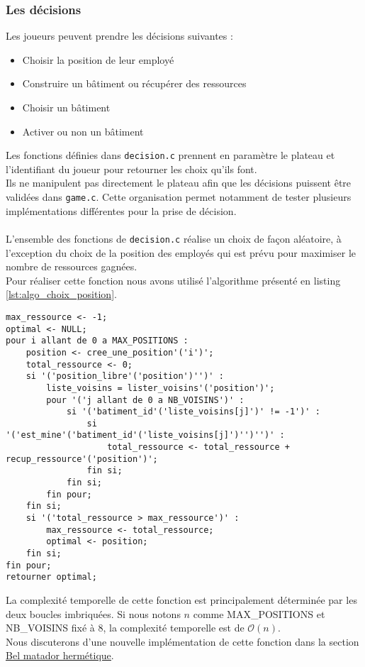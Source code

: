 \subsubsection{Les décisions}
\label{sec:dec}
Les joueurs peuvent prendre les décisions suivantes :
\begin{itemize}
 \setlength\itemsep{0.1em}
\item Choisir la position de leur employé
\item Construire un bâtiment ou récupérer des ressources
\item Choisir un bâtiment
\item Activer ou non un bâtiment
\end{itemize}
Les fonctions définies dans \texttt{decision.c} prennent en paramètre le plateau et l'identifiant du joueur pour retourner les choix qu'ils font.\\
Ils ne manipulent pas directement le plateau afin que les décisions puissent être validées dans \texttt{game.c}. Cette organisation permet notamment de tester plusieurs implémentations différentes pour la prise de décision.\\ \\
L'ensemble des fonctions de \texttt{decision.c} réalise un choix de façon aléatoire, à l'exception du choix de la position des employés qui est prévu pour maximiser le nombre de ressources gagnées.\\
Pour réaliser cette fonction nous avons utilisé l'algorithme présenté en listing \ref{lst:algo_choix_position}. \\
\begin{lstlisting}[style=customstyle]
max_ressource <- -1;
optimal <- NULL;
pour i allant de 0 a MAX_POSITIONS :
    position <- cree_une_position'('i')';
    total_ressource <- 0;
    si '('position_libre'('position')'')' :
        liste_voisins = lister_voisins'('position')';
        pour '('j allant de 0 a NB_VOISINS')' :
            si '('batiment_id'('liste_voisins[j]')' != -1')' :
                si '('est_mine'('batiment_id'('liste_voisins[j]')'')'')' :
                    total_ressource <- total_ressource + recup_ressource'('position')';
                fin si;
            fin si;
        fin pour;
    fin si;
    si '('total_ressource > max_ressource')' :
        max_ressource <- total_ressource;
        optimal <- position;
    fin si;
fin pour;
retourner optimal;
\end{lstlisting}
\label{lst:algo_choix_position}
\vspace{0.5cm}
La complexité temporelle de cette fonction est principalement déterminée par les deux boucles imbriquées.
Si nous notons \(n\) comme MAX\_POSITIONS et NB\_VOISINS fixé à 8, la complexité temporelle est de \(\mathcal{O}(n)\).\\
Nous discuterons d'une nouvelle implémentation de cette fonction dans la section \hyperref[sec:bmh]{\uline{Bel matador hermétique}}.
